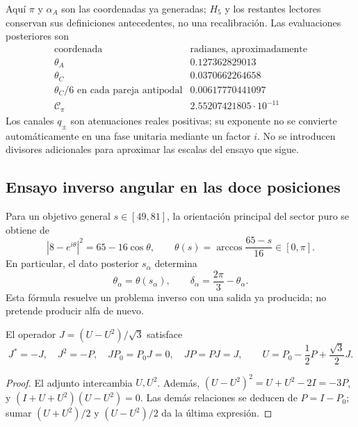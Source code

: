 Aquí \(\pi\) y \(\alpha_A\) son las coordenadas ya generadas;
\(H_5\) y los restantes lectores conservan sus definiciones
antecedentes, no una recalibración. Las evaluaciones posteriores son
\[
\begin{array}{c|c}
 \text{coordenada}&\text{radianes, aproximadamente}\\\hline
 \theta_A&0.127362829013\\
 \theta_C&0.0370662264658\\
 \theta_C/6\text{ en cada pareja antipodal}&0.00617770441097\\
 \mathcal C_\pi&2.55207421805\cdot10^{-11}
\end{array}
\]
Los canales \(q_\pm\) son atenuaciones reales positivas; su exponente
no se convierte automáticamente en una fase unitaria mediante un factor
\(i\). No se introducen divisores adicionales para aproximar las
escalas del ensayo que sigue.

\subsection{Ensayo inverso angular en las doce posiciones}
\label{lib02:ensayo-angular}

Para un objetivo general \(s\in[49,81]\), la orientación principal
del sector puro se obtiene de
\[
 |8-e^{i\theta}|^2=65-16\cos\theta,
 \qquad \theta(s)=\arccos\frac{65-s}{16}\in[0,\pi].
\]
En particular, el dato posterior \(s_\alpha\) determina
\[
 \theta_\alpha=\theta(s_\alpha),\qquad
 \delta_\alpha=\frac{2\pi}{3}-\theta_\alpha.
\]
Esta fórmula resuelve un problema inverso con una salida ya producida;
no pretende producir alfa de nuevo.

\begin{lemma}
\label{lib02:J}
El operador \(J=(U-U^2)/\sqrt3\) satisface
\[
 J^*=-J,\quad J^2=-P,\quad JP_0=P_0J=0,\quad JP=PJ=J,
 \qquad U=P_0-\frac12P+\frac{\sqrt3}{2}J.
\]
\end{lemma}
\begin{proof}
El adjunto intercambia \(U,U^2\). Además,
\((U-U^2)^2=U+U^2-2I=-3P\), y
\((I+U+U^2)(U-U^2)=0\). Las demás relaciones se deducen de
\(P=I-P_0\); sumar \((U+U^2)/2\) y \((U-U^2)/2\)
da la última expresión.
\end{proof}

